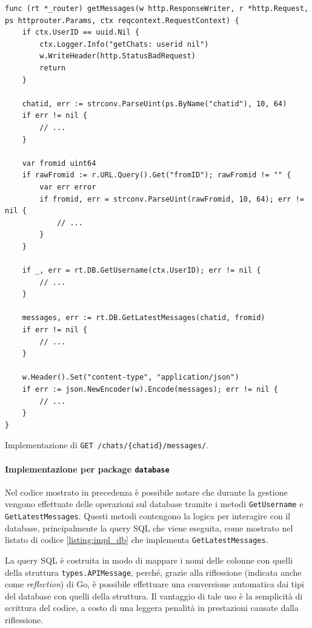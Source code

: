 \begin{longlisting}
\begin{verbatim}
func (rt *_router) getMessages(w http.ResponseWriter, r *http.Request, ps httprouter.Params, ctx reqcontext.RequestContext) {
	if ctx.UserID == uuid.Nil {
		ctx.Logger.Info("getChats: userid nil")
		w.WriteHeader(http.StatusBadRequest)
		return
	}

	chatid, err := strconv.ParseUint(ps.ByName("chatid"), 10, 64)
	if err != nil {
		// ...
	}

	var fromid uint64
	if rawFromid := r.URL.Query().Get("fromID"); rawFromid != "" {
		var err error
		if fromid, err = strconv.ParseUint(rawFromid, 10, 64); err != nil {
		    // ...
		}
	}

	if _, err = rt.DB.GetUsername(ctx.UserID); err != nil {
		// ...
	}

	messages, err := rt.DB.GetLatestMessages(chatid, fromid)
	if err != nil {
		// ...
	}

	w.Header().Set("content-type", "application/json")
	if err := json.NewEncoder(w).Encode(messages); err != nil {
		// ...
	}
}
\end{verbatim}
\caption{Implementazione di \texttt{GET /chats/\{chatid\}/messages/}.}
\label{listing:impl_api}
\end{longlisting}

\paragraph{Implementazione per package \texttt{database}} Nel codice mostrato in precedenza è possibile notare che durante la gestione vengono effettuate delle operazioni sul database tramite i metodi \texttt{GetUsername} e \texttt{GetLatestMessages}. Questi metodi contengono la logica per interagire con il database, principalmente la query SQL che viene eseguita, come mostrato nel listato di codice \ref{listing:impl_db} che implementa \texttt{GetLatestMessages}.

La query SQL è costruita in modo di mappare i nomi delle colonne con quelli della struttura \texttt{types.APIMessage}, perché, grazie alla riflessione (indicata anche come \textit{reflection}) di Go, è possibile effettuare una conversione automatica dai tipi del database con quelli della struttura. Il vantaggio di tale uso è la semplicità di scrittura del codice, a costo di una leggera penalità in prestazioni causate dalla riflessione.

